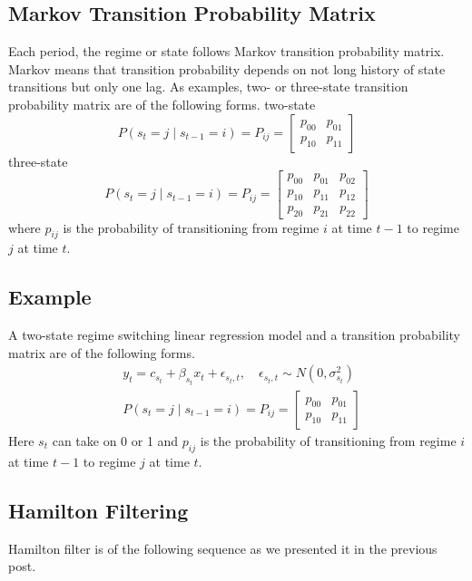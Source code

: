 \documentclass[UTF8,12pt]{ctexart}
\numberwithin{equation}{section}%
\begin{document}
	\subsection{Markov Transition Probability Matrix}
	Each period, the regime or state follows Markov transition probability matrix. Markov means that transition probability depends on not long history of state transitions but only one lag. As examples, two- or three-state transition probability matrix are of the following forms.
	two-state
	$$
	P\left(s_t=j \mid s_{t-1}=i\right)=P_{i j}=\left[\begin{array}{ll}
		p_{00} & p_{01} \\
		p_{10} & p_{11}
	\end{array}\right]
	$$
	three-state
	$$
	P\left(s_t=j \mid s_{t-1}=i\right)=P_{i j}=\left[\begin{array}{lll}
		p_{00} & p_{01} & p_{02} \\
		p_{10} & p_{11} & p_{12} \\
		p_{20} & p_{21} & p_{22}
	\end{array}\right]
	$$
	where $p_{i j}$ is the probability of transitioning from regime $i$ at time $t-1$ to regime $j$ at time $t$.
	
	\subsection{Example}
	
	A two-state regime switching linear regression model and a transition probability matrix are of the following forms.
	$$
	\begin{aligned}
		& y_t=c_{s_t}+\beta_{s_t} x_t+\epsilon_{s_t, t}, \quad \epsilon_{s_t, t} \sim N\left(0, \sigma_{s_t}^2\right) \\
		& P\left(s_t=j \mid s_{t-1}=i\right)=P_{i j}=\left[\begin{array}{ll}
			p_{00} & p_{01} \\
			p_{10} & p_{11}
		\end{array}\right]
	\end{aligned}
	$$
	Here $s_t$ can take on 0 or 1 and $p_{i j}$ is the probability of transitioning from regime $i$ at time $t-1$ to regime $j$ at time $t$.
	
	\subsection{Hamilton Filtering}
	
	Hamilton filter is of the following sequence as we presented it in the previous post.
\end{document}
